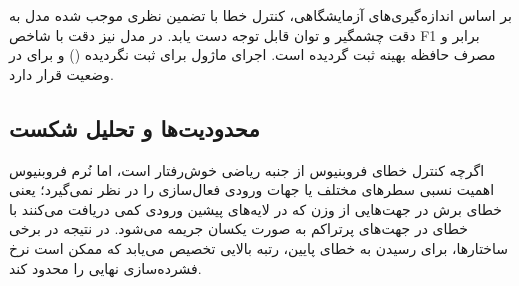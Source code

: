 بر اساس اندازه‌گیری‌های آزمایشگاهی، کنترل خطا با تضمین نظری موجب شده مدل  به دقت چشمگیر  و توان قابل توجه  دست یابد. در مدل  نیز دقت  با شاخص F1 برابر  و مصرف حافظه بهینه  ثبت گردیده است. اجرای ماژول برای  ثبت نگردیده () و برای  در وضعیت  قرار دارد.

\subsection{محدودیت‌ها و تحلیل شکست}
اگرچه کنترل خطای فروبنیوس از جنبه ریاضی خوش‌رفتار است، اما نُرم فروبنیوس اهمیت نسبی سطرهای مختلف یا جهات ورودی فعال‌سازی را در نظر نمی‌گیرد؛ یعنی خطای برش در جهت‌هایی از وزن که در لایه‌های پیشین ورودی کمی دریافت می‌کنند با خطای در جهت‌های پرتراکم به صورت یکسان جریمه می‌شود. در نتیجه در برخی ساختارها، برای رسیدن به خطای پایین، رتبه بالایی تخصیص می‌یابد که ممکن است نرخ فشرده‌سازی نهایی را محدود کند.
